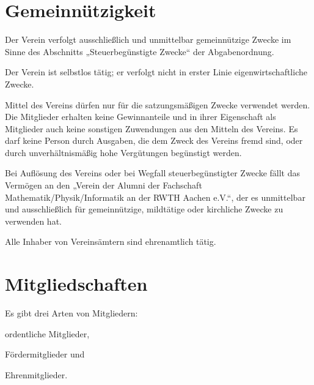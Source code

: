 \section{Gemeinnützigkeit}
\begin{para}
	\item Der Verein verfolgt ausschließlich und unmittelbar gemeinnützige Zwecke im Sinne des Abschnitts „Steuerbegünstigte Zwecke“ der Abgabenordnung.
	\item Der Verein ist selbstlos tätig; er verfolgt nicht in erster Linie eigen\-wirtschaftliche Zwecke.
	\item Mittel des Vereins dürfen nur für die satzungsmäßigen Zwecke verwendet werden. Die Mitglieder erhalten keine Gewinnanteile und in ihrer Eigenschaft als Mitglieder auch keine sonstigen Zuwendungen aus den Mitteln des Vereins. Es darf keine Person durch Ausgaben, die dem Zweck des Vereins fremd sind, oder durch unverhältnismäßig hohe Vergütungen begünstigt werden.
	\item Bei Auflösung des Vereins oder bei Wegfall steuerbegünstigter Zwecke fällt das Vermögen an den „Verein der Alumni der Fachschaft Mathematik/Physik/Informatik an der RWTH Aachen e.V.“, der es unmittelbar und ausschließlich für gemeinnützige, mildtätige oder kirchliche Zwecke zu verwenden hat.
	\item Alle Inhaber von Vereinsämtern sind ehrenamtlich tätig.
\end{para}

\section{Mitgliedschaften}
Es gibt drei Arten von Mitgliedern:
\begin{para}
	\item ordentliche Mitglieder,
	\item Fördermitglieder und
	\item Ehrenmitglieder.
\end{para}

